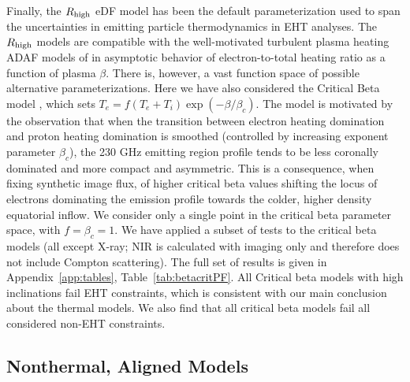 Finally, the $R_\mathrm{high}$ eDF model has been the default parameterization used to span the uncertainties in emitting particle thermodynamics in EHT analyses. The $R_\mathrm{high}$ models  are compatible with the well-motivated turbulent plasma heating ADAF models of \cite{1999ApJ...520..248Q} in asymptotic behavior of electron-to-total heating ratio as a function of plasma $\beta$. There is, however, a vast function space of possible alternative parameterizations. Here we have also considered the Critical Beta model \cite{2020MNRAS.493.1404A}, which sets $T_e = f (T_e + T_i) \exp(-\beta/\beta_c)$.  The model is motivated by the observation that when the transition between electron heating domination and proton heating domination is smoothed (controlled by increasing exponent parameter $\beta_c$), the 230 GHz emitting region profile tends to be less coronally dominated and more compact and asymmetric. This is a consequence, when fixing synthetic image flux, of higher critical beta values shifting the locus of electrons dominating the emission profile towards the colder, higher density equatorial inflow.  We consider only a single point in the critical beta parameter space, with $f = \beta_c = 1$. We have applied a subset of tests to the critical beta models (all except X-ray; NIR is calculated with imaging only and therefore does not include Compton scattering).  The full set of results is given in Appendix~\ref{app:tables}, Table~\ref{tab:betacritPF}. All Critical beta models with high inclinations fail EHT constraints, which is consistent with our main conclusion about the thermal models. We also find that all critical beta models fail all considered non-EHT constraints.




\subsection{Nonthermal, Aligned Models}


